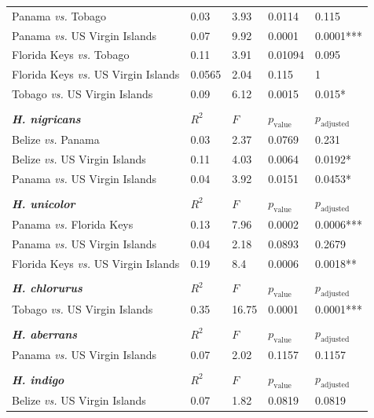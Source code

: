 \begin{xltabular}{\textwidth}{p{5cm}*{4}{X}}
    Panama \emph{vs.} Tobago & 0.03 & 3.93 & 0.0114 & 0.115 \\
    Panama \emph{vs.} US Virgin Islands & 0.07 & 9.92 & 0.0001 & 0.0001*** \\
    Florida Keys \emph{vs.} Tobago & 0.11 & 3.91 & 0.01094 & 0.095 \\
    Florida Keys \emph{vs.} US Virgin Islands & 0.0565 & 2.04 & 0.115 & 1\\
    Tobago \emph{vs.} US Virgin Islands & 0.09 & 6.12 & 0.0015 & 0.015* \\ \\
    \hline \hline
    \textbf{\emph{H. nigricans}} & $R^2$ & $F$ & $p_{\text{value}}$ & $p_{\text{adjusted}}$\\
    \hline
    \hline
    Belize \emph{vs.} Panama & 0.03 & 2.37 & 0.0769 & 0.231 \\
    Belize \emph{vs.} US Virgin Islands & 0.11 & 4.03 & 0.0064 & 0.0192* \\
    Panama \emph{vs.} US Virgin Islands & 0.04 & 3.92 & 0.0151 & 0.0453* \\ \\
    \hline \hline
    \textbf{\emph{H. unicolor}} & $R^2$ & $F$ & $p_{\text{value}}$ & $p_{\text{adjusted}}$\\
    \hline
    \hline
    Panama \emph{vs.} Florida Keys & 0.13 & 7.96 & 0.0002 & 0.0006*** \\
    Panama \emph{vs.} US Virgin Islands & 0.04 & 2.18 & 0.0893 & 0.2679 \\
    Florida Keys \emph{vs.} US Virgin Islands & 0.19 & 8.4 & 0.0006 & 0.0018** \\ \\
    \hline \hline
    \textbf{\emph{H. chlorurus}} & $R^2$ & $F$ & $p_{\text{value}}$ & $p_{\text{adjusted}}$\\
    \hline
    \hline
    Tobago \emph{vs.} US Virgin Islands & 0.35 & 16.75 & 0.0001 & 0.0001*** \\ \\
    \hline \hline
    \textbf{\emph{H. aberrans}} & $R^2$ & $F$ & $p_{\text{value}}$ & $p_{\text{adjusted}}$\\
    \hline
    \hline
    Panama \emph{vs.} US Virgin Islands & 0.07 & 2.02 & 0.1157 & 0.1157 \\ \\
    \hline \hline
    \textbf{\emph{H. indigo}} & $R^2$ & $F$ & $p_{\text{value}}$ & $p_{\text{adjusted}}$\\
    \hline
    \hline
    Belize \emph{vs.} US Virgin Islands & 0.07 & 1.82 & 0.0819 & 0.0819 \\
    \hline
\end{xltabular}